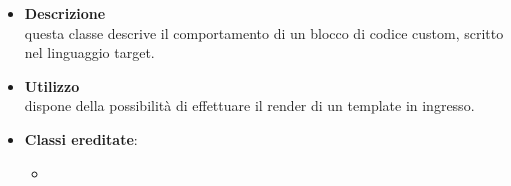 \label{\nogloxy{swedesigner::server::project::ParsedCustom}}
\begin{itemize}
\item \textbf{Descrizione}\\
questa classe descrive il comportamento di un blocco di codice custom, scritto nel linguaggio target.	
\item \textbf{Utilizzo}\\
dispone della possibilità di effettuare il render di un template in ingresso.
\item \textbf{Classi ereditate}:
\begin{itemize}
\item \hyperref[\nogloxy{swedesigner::server::project::ParsedInstruction}]{}
\end{itemize}
\end{itemize}

